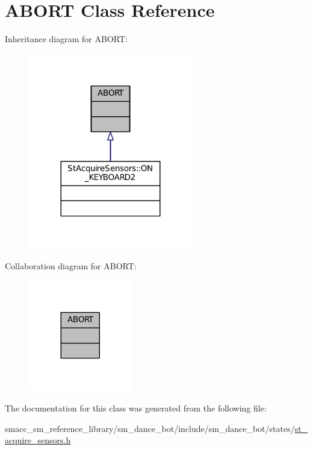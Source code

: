 \hypertarget{classABORT}{}\section{A\+B\+O\+RT Class Reference}
\label{classABORT}


Inheritance diagram for A\+B\+O\+RT\+:
\nopagebreak
\begin{figure}[H]
\begin{center}
\leavevmode
\includegraphics[width=203pt]{classABORT__inherit__graph}
\end{center}
\end{figure}


Collaboration diagram for A\+B\+O\+RT\+:
\nopagebreak
\begin{figure}[H]
\begin{center}
\leavevmode
\includegraphics[width=128pt]{classABORT__coll__graph}
\end{center}
\end{figure}


The documentation for this class was generated from the following file\+:\begin{DoxyCompactItemize}
\item 
smacc\+\_\+sm\+\_\+reference\+\_\+library/sm\+\_\+dance\+\_\+bot/include/sm\+\_\+dance\+\_\+bot/states/\hyperlink{st__acquire__sensors_8h}{st\+\_\+acquire\+\_\+sensors.\+h}\end{DoxyCompactItemize}
